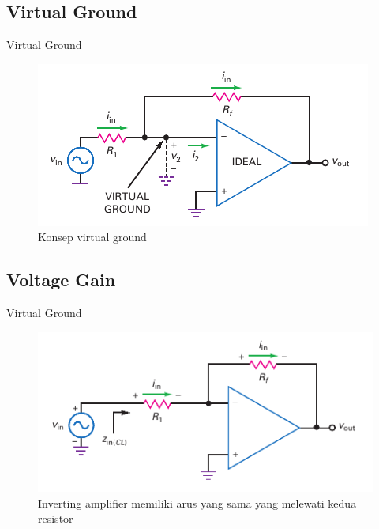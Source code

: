 \subsection{Virtual Ground}
\begin{frame}{Virtual Ground}
	\begin{figure}
		\centering
		\includegraphics[height=0.5\textheight]{gambar/fig-16.13}
		\caption{Konsep virtual ground}
		\label{fig-16.13}
	\end{figure}
\end{frame}

\subsection{Voltage Gain}
\begin{frame}{Virtual Ground}
	\begin{figure}
		\centering
		\includegraphics[height=0.5\textheight]{gambar/fig-16.14}
		\caption{Inverting amplifier memiliki arus yang sama yang melewati kedua resistor}
		\label{fig-16.14}
	\end{figure}
\end{frame}
